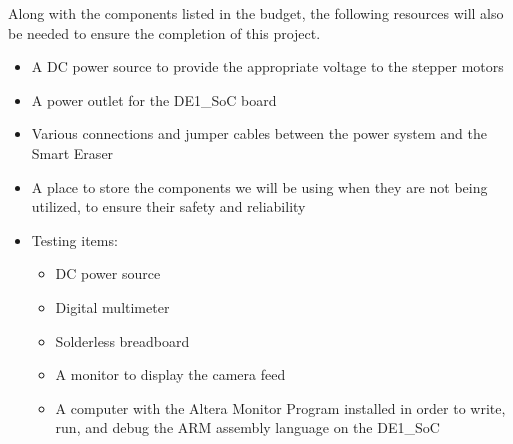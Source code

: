 Along with the components listed in the budget, the following resources will also be needed to ensure the completion of this project.
\begin{itemize}
	\item A DC power source to provide the appropriate voltage to the stepper motors
	\item A power outlet for the DE1\_SoC board
	\item Various connections and jumper cables between the power system and the Smart Eraser
	\item A place to store the components we will be using when they are not being utilized, to ensure their safety and reliability
	\item Testing items:
	\begin{itemize}
		\item DC power source
		\item Digital multimeter
		\item Solderless breadboard
		\item A monitor to display the camera feed
		\item A computer with the Altera Monitor Program installed in order to write, run, and debug the ARM assembly language on the DE1\_SoC
	\end{itemize}
\end{itemize}


